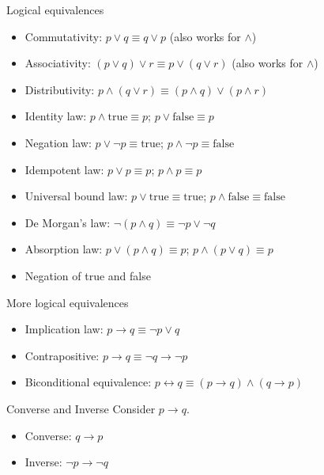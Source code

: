 \documentclass[10pt]{beamer}
\begin{document}
\begin{frame}[fragile]{Logical equivalences}
\begin{itemize}
  \item Commutativity: $p \lor q \equiv q \lor p$ (also works for $\land$)
  \item Associativity: $(p \lor q) \lor r \equiv p \lor (q \lor r)$ (also works for $\land$)
  \item Distributivity: $p \land (q \lor r) \equiv (p \land q) \lor (p \land r)$
  \item Identity law: $p \land \text{true} \equiv p$; $p \lor \text{false} \equiv p$
  \item Negation law: $p \lor \lnot p \equiv \text{true}$; $p \land \lnot p \equiv \text{false}$
  \item Idempotent law: $p \lor p \equiv p$; $p \land p \equiv p$
  \item Universal bound law: $p \lor \text{true} \equiv \text{true}$; $p \land \text{false} \equiv \text{false}$
  \item De Morgan's law: $\lnot (p \land q) \equiv \lnot p \lor \lnot q$
  \item Absorption law: $p \lor (p \land q) \equiv p$; $p \land (p \lor q) \equiv p$
  \item Negation of true and false
\end{itemize}
\end{frame}

\begin{frame}[fragile]{More logical equivalences}
\begin{itemize}
  \item Implication law: $p \rightarrow q \equiv \lnot p \lor q$
  \item Contrapositive: $p \rightarrow q \equiv \lnot q \rightarrow \lnot p$
  \item Biconditional equivalence: $p \leftrightarrow q \equiv (p \rightarrow q) \land (q \rightarrow p)$
\end{itemize}
\end{frame}

\begin{frame}[fragile]{Converse and Inverse}
Consider $p \rightarrow q$.
\begin{itemize}
  \item Converse: $q \rightarrow p$
  \item Inverse: $\lnot p \rightarrow \lnot q$
\end{itemize}
\end{frame}
\end{document}
